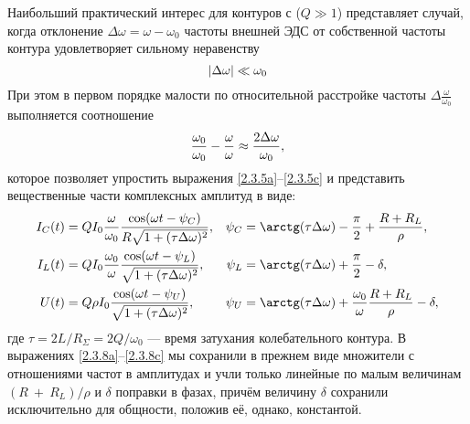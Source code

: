 Наибольший практический интерес для контуров с 
($Q\gg1$) представляет случай, когда отклонение $\Delta\omega=\omega-\omega_0$ частоты
внешней ЭДС от собственной частоты контура удовлетворяет сильному неравенству
\begin{equation}\eqmark{2.3.6}
|\Delta\omega|\ll \omega_0
\end{equation}
При этом в первом порядке малости по относительной расстройке частоты 
$\Delta\frac{\omega}{\omega_0}$ выполняется соотношение
\begin{equation}\eqmark{2.3.7}
\frac{\omega_0}{\omega_0}-\frac{\omega}{\omega}\approx\frac{2\Delta\omega}{\omega_0},
\end{equation}
которое позволяет упростить выражения \eqref{2.3.5a}--\eqref{2.3.5c} 
и представить вещественные части комплексных амплитуд в виде:
\begin{align}
			\eqmark{2.3.8a}
			I_C(t) &= QI_0\dfrac{\omega}{\omega_0}
                \dfrac{\cos(\omega t-\psi_C)}{R\sqrt{1+(\tau\Delta\omega)^2}}, &
            \psi_C &=
                \arctg(\tau\Delta\omega)-\dfrac{\pi}{2}+\dfrac{R+R_L}{\rho}, \\
			\eqmark{2.3.8b}
			I_L(t) &= QI_0\dfrac{\omega_0}{\omega} 
                \dfrac{\cos(\omega t-\psi_L)}{\sqrt{1+(\tau\Delta\omega)^2}}, &
            \psi_L &= \arctg(\tau\Delta\omega)+\dfrac{\pi}{2}-\delta, \\
			\eqmark{2.3.8c}
			U(t) &= Q\rho I_0 \dfrac{\cos(\omega t-\psi_U)}{%
                \sqrt{1+(\tau\Delta\omega)^2}}, &
            \psi_U &=\arctg(\tau\Delta\omega)+
                \dfrac{\omega_0}{\omega}\dfrac{R+R_L}{\rho}-\delta,
\end{align}
%
где $\tau=2L/R_{\Sigma}=2Q/\omega_0$ --- время затухания
колебательного контура. В выражениях \eqref{2.3.8a}--\eqref{2.3.8c} 
мы сохранили в прежнем виде множители с отношениями частот в амплитудах и учли только линейные по малым
величинам $(R~+~R_L)/\rho$ и $\delta$ поправки в фазах, причём величину $\delta$
сохранили исключительно для общности, положив её, однако, константой.


